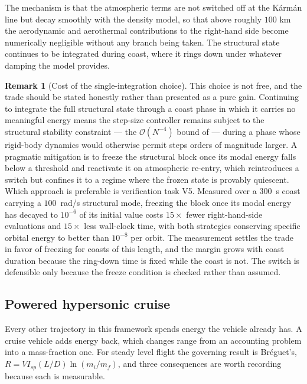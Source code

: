 \documentclass[11pt,a4paper]{article}
\theoremstyle{definition}
\newtheorem{remark}[theorem]{Remark}
\numberwithin{equation}{section}
\begin{document}
The mechanism is that the atmospheric terms are not switched off at the Kármán line but decay smoothly with the density model, so that above roughly $100$ km the aerodynamic and aerothermal contributions to the right-hand side become numerically negligible without any branch being taken. The structural state continues to be integrated during coast, where it rings down under whatever damping the model provides.

\begin{remark}[Cost of the single-integration choice]
\label{rem:idle}
This choice is not free, and the trade should be stated honestly rather than presented as a pure gain. Continuing to integrate the full structural state through a coast phase in which it carries no meaningful energy means the step-size controller remains subject to the structural stability constraint --- the $\mathcal{O}(N^{-4})$ bound of \cite{knox2026passes} --- during a phase whose rigid-body dynamics would otherwise permit steps orders of magnitude larger. A pragmatic mitigation is to freeze the structural block once its modal energy falls below a threshold and reactivate it on atmospheric re-entry, which reintroduces a switch but confines it to a regime where the frozen state is provably quiescent. Which approach is preferable is verification task V5. Measured over a $300$~s coast carrying a $100$~rad/s structural mode, freezing the block once its modal energy has decayed to $10^{-6}$ of its initial value costs $15\times$ fewer right-hand-side evaluations and $15\times$ less wall-clock time, with both strategies conserving specific orbital energy to better than $10^{-8}$ per orbit. The measurement settles the trade in favor of freezing for coasts of this length, and the margin grows with coast duration because the ring-down time is fixed while the coast is not. The switch is defensible only because the freeze condition is checked rather than assumed.
\end{remark}

\subsection{Powered hypersonic cruise}
\label{sec:cruise}

Every other trajectory in this framework spends energy the vehicle already has. A cruise vehicle adds energy back, which changes range from an accounting problem into a mass-fraction one. For steady level flight the governing result is Br\'eguet's, $R = V I_{sp} (L/D) \ln(m_i/m_f)$, and three consequences are worth recording because each is measurable.
\end{document}
